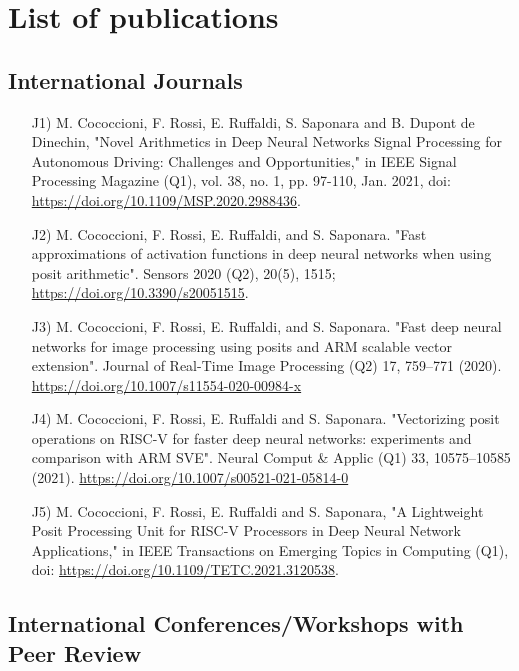 \chapter*{List of publications}

\section*{International Journals}
\begin{enumerate}
    \item[J1)] M. Cococcioni, F. Rossi, E. Ruffaldi, S. Saponara and B. Dupont de Dinechin, "Novel Arithmetics in Deep Neural Networks Signal Processing for Autonomous Driving: Challenges and Opportunities," in IEEE Signal Processing Magazine (Q1), vol. 38, no. 1, pp. 97-110, Jan. 2021, doi: \url{https://doi.org/10.1109/MSP.2020.2988436}.
    \item[J2)] M. Cococcioni, F. Rossi, E. Ruffaldi, and S. Saponara. "Fast approximations of activation functions in deep neural networks when using posit arithmetic". Sensors 2020 (Q2), 20(5), 1515; \url{https://doi.org/10.3390/s20051515}.
    \item[J3)] M. Cococcioni, F. Rossi, E. Ruffaldi, and S. Saponara. "Fast deep neural networks for image processing using posits and ARM scalable vector extension". Journal of Real-Time Image Processing (Q2) 17, 759–771 (2020). \url{https://doi.org/10.1007/s11554-020-00984-x}
    \item[J4)] M. Cococcioni, F. Rossi, E. Ruffaldi and S. Saponara. "Vectorizing posit operations on RISC-V for faster deep neural networks: experiments and comparison with ARM SVE". Neural Comput \& Applic (Q1) 33, 10575–10585 (2021). \url{https://doi.org/10.1007/s00521-021-05814-0}
    \item[J5)] M. Cococcioni, F. Rossi, E. Ruffaldi and S. Saponara, "A Lightweight Posit Processing Unit for RISC-V Processors in Deep Neural Network Applications," in IEEE Transactions on Emerging Topics in Computing (Q1), doi: \url{https://doi.org/10.1109/TETC.2021.3120538}.
  

\end{enumerate}
\section*{International Conferences/Workshops with Peer Review}


